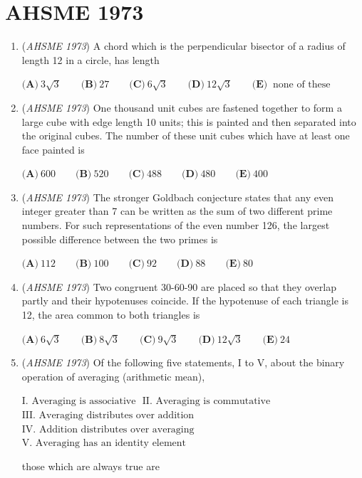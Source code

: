 \section{AHSME 1973}
        \begin{enumerate}
        	\item (\textit{AHSME 1973}) A chord which is the perpendicular bisector of a radius of length 12 in a circle, has length 


  $\textbf{(A)}\ 3\sqrt3\qquad\textbf{(B)}\ 27\qquad\textbf{(C)}\ 6\sqrt3\qquad\textbf{(D)}\ 12\sqrt3\qquad\textbf{(E)}\ \text{ none of these}$


	\item (\textit{AHSME 1973}) One thousand unit cubes are fastened together to form a large cube with edge length 10 units; this is painted and then separated into the original cubes. The number of these unit cubes which have at least one face painted is 


  $\textbf{(A)}\ 600\qquad\textbf{(B)}\ 520\qquad\textbf{(C)}\ 488\qquad\textbf{(D)}\ 480\qquad\textbf{(E)}\ 400$


	\item (\textit{AHSME 1973}) The stronger Goldbach conjecture states that any even integer greater than 7 can be written as the sum of two different prime numbers. For such representations of the even number 126, the largest possible difference between the two primes is 


  $\textbf{(A)}\ 112\qquad\textbf{(B)}\ 100\qquad\textbf{(C)}\ 92\qquad\textbf{(D)}\ 88\qquad\textbf{(E)}\ 80$


	\item (\textit{AHSME 1973}) Two congruent 30-60-90 are placed so that they overlap partly and their hypotenuses coincide. If the hypotenuse of each triangle is 12, the area common to both triangles is 


  $\textbf{(A)}\ 6\sqrt3\qquad\textbf{(B)}\ 8\sqrt3\qquad\textbf{(C)}\ 9\sqrt3\qquad\textbf{(D)}\ 12\sqrt3\qquad\textbf{(E)}\ 24$


	\item (\textit{AHSME 1973}) Of the following five statements, I to V, about the binary operation of averaging (arithmetic mean), 


 $\text{I. Averaging is associative }$
$\text{II. Averaging is commutative }$
$\text{III. Averaging distributes over addition }$
$\text{IV. Addition distributes over averaging }$
$\text{V. Averaging has an identity element }$


 those which are always true are 



\end{enumerate}
